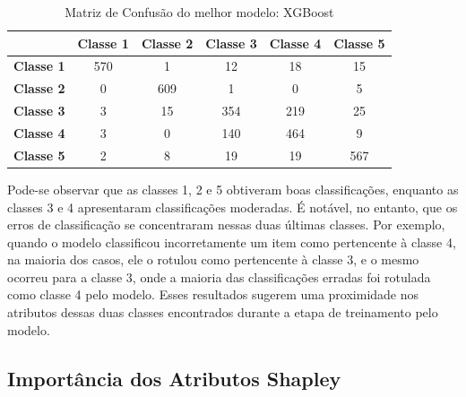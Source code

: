 \documentclass[12pt,oneside,a4paper,chapter=TITLE,
			   english,brazil]{abntex2}
\begin{document}
\begin{table}[H]
    \centering
    \caption[Matriz de Confusão do melhor modelo: XGBoost]{Matriz de Confusão do melhor modelo:
     XGBoost}
    \begin{tabular}{@{}cccccc@{}}
        \toprule
        & \textbf{Classe 1} & \textbf{Classe 2} & \textbf{Classe 3} & \textbf{Classe 4} & \textbf{Classe 5} \\
        \midrule
        \textbf{Classe 1} & 570 & 1 & 12 & 18 & 15 \\
        \textbf{Classe 2} & 0 & 609 & 1 & 0 & 5 \\
        \textbf{Classe 3} & 3 & 15 & 354 & 219 & 25 \\
        \textbf{Classe 4} & 3 & 0 & 140 & 464 & 9 \\
        \textbf{Classe 5} & 2 & 8 & 19 & 19 & 567 \\
        \bottomrule
    \end{tabular}
       \label{tab:melhorxgbost}
\end{table}
 \begin{flushleft}
\vspace{-1.0em}
\centering
{}
\end{flushleft}
 
 
 Pode-se observar que as classes 1, 2 e 5 obtiveram boas classificações, enquanto as classes 3 e 4 apresentaram classificações moderadas. É notável, no entanto, que os erros de classificação se concentraram nessas duas últimas classes. Por exemplo, quando o modelo classificou incorretamente um item como pertencente à classe 4, na maioria dos casos, ele o rotulou como pertencente à classe 3, e o mesmo ocorreu para a classe 3, onde a maioria das classificações erradas foi rotulada como classe 4 pelo modelo. Esses resultados sugerem uma proximidade nos atributos dessas duas classes encontrados durante a etapa de treinamento pelo modelo.



\subsection{Importância dos Atributos Shapley}
\end{document}
